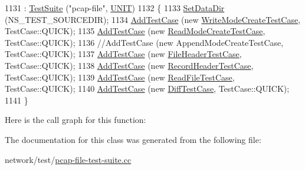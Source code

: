 \begin{DoxyCode}
1131   : \hyperlink{classns3_1_1TestSuite_a904b0c40583b744d30908aeb94636d1a}{TestSuite} (\textcolor{stringliteral}{"pcap-file"}, \hyperlink{classns3_1_1TestSuite_a1ebfcab34ec8161e085e8e3a1855eae0a3885375a3787abf60431f8454b3cadbd}{UNIT})
1132 \{
1133   \hyperlink{classns3_1_1TestCase_ab002fb0e5071fcde71a92ca9e8224b23}{SetDataDir} (NS\_TEST\_SOURCEDIR);
1134   \hyperlink{classns3_1_1TestCase_a3718088e3eefd5d6454569d2e0ddd835}{AddTestCase} (\textcolor{keyword}{new} \hyperlink{classWriteModeCreateTestCase}{WriteModeCreateTestCase}, TestCase::QUICK);
1135   \hyperlink{classns3_1_1TestCase_a3718088e3eefd5d6454569d2e0ddd835}{AddTestCase} (\textcolor{keyword}{new} \hyperlink{classReadModeCreateTestCase}{ReadModeCreateTestCase}, TestCase::QUICK);
1136   \textcolor{comment}{//AddTestCase (new AppendModeCreateTestCase, TestCase::QUICK);}
1137   \hyperlink{classns3_1_1TestCase_a3718088e3eefd5d6454569d2e0ddd835}{AddTestCase} (\textcolor{keyword}{new} \hyperlink{classFileHeaderTestCase}{FileHeaderTestCase}, TestCase::QUICK);
1138   \hyperlink{classns3_1_1TestCase_a3718088e3eefd5d6454569d2e0ddd835}{AddTestCase} (\textcolor{keyword}{new} \hyperlink{classRecordHeaderTestCase}{RecordHeaderTestCase}, TestCase::QUICK);
1139   \hyperlink{classns3_1_1TestCase_a3718088e3eefd5d6454569d2e0ddd835}{AddTestCase} (\textcolor{keyword}{new} \hyperlink{classReadFileTestCase}{ReadFileTestCase}, TestCase::QUICK);
1140   \hyperlink{classns3_1_1TestCase_a3718088e3eefd5d6454569d2e0ddd835}{AddTestCase} (\textcolor{keyword}{new} \hyperlink{classDiffTestCase}{DiffTestCase}, TestCase::QUICK);
1141 \}
\end{DoxyCode}


Here is the call graph for this function\+:




The documentation for this class was generated from the following file\+:\begin{DoxyCompactItemize}
\item 
network/test/\hyperlink{pcap-file-test-suite_8cc}{pcap-\/file-\/test-\/suite.\+cc}\end{DoxyCompactItemize}
